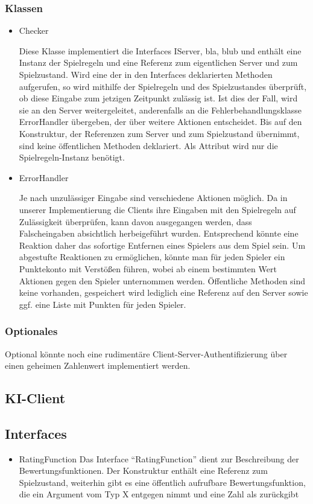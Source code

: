 \documentclass[a4paper,10pt]{article}
\begin{document}
\subsubsection{Klassen}
\begin{itemize}
\item Checker

Diese Klasse implementiert die Interfaces IServer, bla, blub und enthält eine Instanz der Spielregeln und eine Referenz zum eigentlichen Server und zum Spielzustand. Wird eine der in den Interfaces deklarierten Methoden aufgerufen, so wird mithilfe der Spielregeln und des Spielzustandes überprüft, ob diese Eingabe zum jetzigen Zeitpunkt zulässig ist. Ist dies der Fall, wird sie an den Server weitergeleitet, anderenfalls an die Fehlerbehandlungsklasse ErrorHandler übergeben, der über weitere Aktionen entscheidet. Bis auf den Konstruktur, der Referenzen zum Server und zum Spielzustand übernimmt, sind keine öffentlichen Methoden deklariert. Als Attribut wird nur die Spielregeln-Instanz benötigt.
\item ErrorHandler

Je nach unzulässiger Eingabe sind verschiedene Aktionen möglich. Da in unserer Implementierung die Clients ihre Eingaben mit den Spielregeln auf Zulässigkeit überprüfen, kann davon ausgegangen werden, dass Falscheingaben absichtlich herbeigeführt wurden. Entsprechend könnte eine Reaktion daher das sofortige Entfernen eines Spielers aus dem Spiel sein. Um abgestufte Reaktionen zu ermöglichen, könnte man für jeden Spieler ein Punktekonto mit Verstößen führen, wobei ab einem bestimmten Wert Aktionen gegen den Spieler unternommen werden. Öffentliche Methoden sind keine vorhanden, gespeichert wird lediglich eine Referenz auf den Server sowie ggf. eine Liste mit Punkten für jeden Spieler.
\end{itemize}
\subsubsection{Optionales}
Optional könnte noch eine rudimentäre Client-Server-Authentifizierung über einen geheimen Zahlenwert implementiert werden.
\subsection{KI-Client}
\subsection{Interfaces}
\begin{itemize}
\item RatingFunction
Das Interface "`RatingFunction"' dient zur Beschreibung der Bewertungsfunktionen. Der Konstruktur enthält eine Referenz zum Spielzustand, weiterhin gibt es eine öffentlich aufrufbare Bewertungsfunktion, die ein Argument vom Typ X entgegen nimmt und eine Zahl als zurückgibt
\end{itemize}
\end{document}
